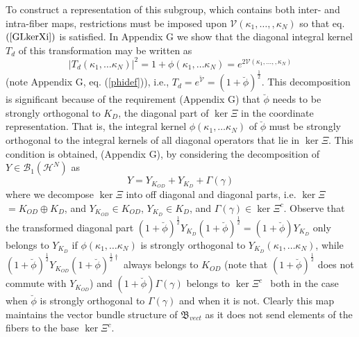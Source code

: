 \documentclass[aps,preprint]{revtex4}%
\begin{document}
To construct a representation of this subgroup, which contains both inter- and
intra-fiber maps, restrictions must be imposed upon $\mathcal{V}(\kappa
_{1},\ldots,,\kappa_{N})$ so that eq. $\left(  \ref{GLkerXi}\right)  $ is
satisfied. In Appendix G we show that the diagonal integral kernel $T_{d}$ of
this transformation may be written as
\begin{equation}
|T_{d}(\kappa_{1},\ldots\kappa_{N})|^{2}=1+\phi(\kappa_{1},\ldots\kappa
_{N})=e^{2\mathcal{V}(\kappa_{1},\ldots,,\kappa_{N})}%
\end{equation}
(note Appendix G, eq. (\ref{phidef})), i.e., $T_{d}=e^{\breve{\mathcal{V}}%
}=\left(  1+\breve{\phi}\right)  ^{\frac{1}{2}}$. This decomposition is
significant because of the requirement (Appendix G) that $\breve{\phi}$ needs
to be strongly orthogonal to $K_{D}$, the diagonal part of $\ker\Xi$ in the
coordinate representation. That is, the integral kernel $\phi(\kappa
_{1},\ldots\kappa_{N})$ of $\breve{\phi}$ must be strongly orthogonal to the
integral kernels of all diagonal operators that lie in $\ker\Xi$. This
condition is obtained, (Appendix G), by considering the decomposition of
$Y\in\mathcal{B}_{1}(\mathcal{H}^{N})$ as
\begin{equation}
Y=Y_{K_{OD}}+Y_{K_{D}}+\Gamma\left(  \gamma\right)
\end{equation}
where we decompose $\ker\Xi$ into off diagonal and diagonal parts, i.e.
$\ker\Xi$ $=K_{OD}\oplus K_{D}$, and $Y_{K_{OD}}\in K_{OD}$, $Y_{K_{D}}\in
K_{D}$, and $\Gamma\left(  \gamma\right)  \in\ker\Xi^{c}$. Observe that the
transformed diagonal part $\left(  1+\breve{\phi}\right)  ^{\frac{1}{2}%
}Y_{K_{D}}\left(  1+\breve{\phi}\right)  ^{\frac{1}{2}}=\left(  1+\breve{\phi
}\right)  Y_{K_{D}}$ only belongs to $Y_{K_{D}}$ if $\phi\left(  \kappa
_{1},\ldots\kappa_{N}\right)  $ is strongly orthogonal to $Y_{K_{D}}\left(
\kappa_{1},\ldots\kappa_{N}\right)  $, while $\left(  1+\breve{\phi}\right)
^{\frac{1}{2}}Y_{K_{OD}}\left(  1+\breve{\phi}\right)  ^{\frac{1}{2}\dagger}$
always belongs to $K_{OD}$ (note that $\left(  1+\breve{\phi}\right)
^{\frac{1}{2}}$ does not commute with $Y_{K_{OD}}$) and $\left(  1+\breve
{\phi}\right)  \Gamma\left(  \gamma\right)  $ belongs to $\ker\Xi^{c\text{ }}$
both in the case when $\breve{\phi}$ is strongly orthogonal to $\Gamma\left(
\gamma\right)  $ and when it is not. Clearly this map maintains the vector
bundle structure of $\mathfrak{B}_{vect}$ as it does not send elements of the
fibers to the base $\ker\Xi^{c}$.
\end{document}
